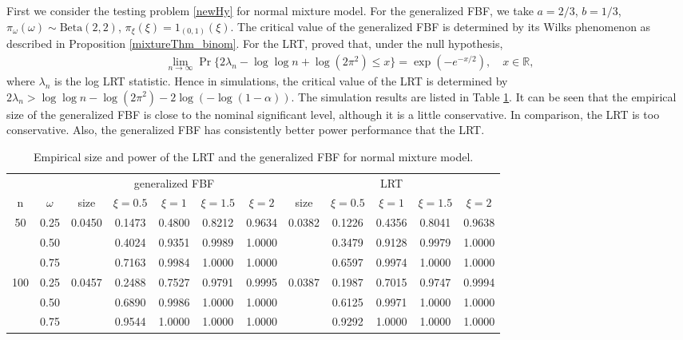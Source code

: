 \documentclass[11pt]{article}
\theoremstyle{plain}
\theoremstyle{definition}
\theoremstyle{remark}
\begin{document}
First we consider the testing problem \eqref{newHy} for normal mixture model.
For the generalized FBF, we take $a = 2/3$, $b = 1/3$,  $\pi_\omega(\omega)\sim \text{Beta}(2, 2)$, $\pi_\xi(\xi) = 1_{(0,1)}(\xi)$.
The critical value of the generalized FBF is determined by its Wilks phenomenon as described in Proposition \ref{mixtureThm_binom}.
For the LRT, \cite{LIU200461} proved that, under the null hypothesis,
\begin{align*}
    \lim_{n\to \infty}  \Pr \{ 2\lambda_n - \log \log n + \log(2\pi^2) \leq x \} =  \exp(-e^{-x/2}), \quad x \in \mathbb R,
\end{align*}
where $\lambda_n$ is the log LRT statistic.
Hence in simulations, the critical value of the LRT is determined by $2\lambda_n > \log \log n - \log (2\pi^2) - 2\log(-\log(1-\alpha))$.
The simulation results are listed in Table \ref{normal_table1}.
It can be seen that the empirical size of the generalized FBF is close to the nominal significant level, although it is a little conservative.
In comparison, the LRT is too conservative.
Also, the generalized FBF has consistently better power performance that the LRT.
\begin{table}[ht]
    \caption{Empirical size and power of the LRT and the generalized FBF for normal mixture model.}
    \label{normal_table1}
    \small
    \centering
    \begin{tabular}{cccccccccccc}
        \toprule
         & & \multicolumn{5}{c}{generalized FBF} &\multicolumn{5}{c}{LRT}\\
        \cmidrule(r){3-7}\cmidrule(r){8-12}
        n & $\omega$ 
        & size & $\xi= 0.5$& $\xi= 1$ & $\xi= 1.5$ & $\xi= 2$
        & size & $\xi= 0.5$& $\xi= 1$ & $\xi= 1.5$ & $\xi= 2$
        \\ 
        \midrule
        50 &0.25& 0.0450& 0.1473& 0.4800& 0.8212 &0.9634& 0.0382  & 0.1226& 0.4356 & 0.8041 & 0.9638 \\
        &0.50   &       & 0.4024& 0.9351& 0.9989 &1.0000&         &0.3479 & 0.9128 & 0.9979 & 1.0000 \\
        &0.75 &         &0.7163 & 0.9984& 1.0000 &1.0000&         &0.6597 & 0.9974 & 1.0000 & 1.0000 \\
        \midrule
        100 &0.25 &0.0457& 0.2488& 0.7527& 0.9791 &0.9995& 0.0387 & 0.1987& 0.7015 & 0.9747 & 0.9994\\
        &0.50   &       & 0.6890& 0.9986& 1.0000 &1.0000&       & 0.6125 & 0.9971 & 1.0000 & 1.0000\\
        &0.75   &       & 0.9544& 1.0000& 1.0000 &1.0000&       & 0.9292& 1.0000& 1.0000 & 1.0000\\
        \bottomrule

    \end{tabular}

\end{table}
\end{document}
